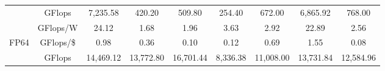 \begin{table}[h]
\begin{adjustwidth}{-1.0in}{-1.0in}
\begin{center}
{\begin{tabular}{cc||c|c|c|c|c|c|c}
                                  &  GFlops                                                                                 & 7,235.58                                                        & 420.20                                                           & 509.80                                                               & 254.40                                                        & 672.00                                                               & 6,865.92                                                               & 768.00                                                                 \\
                                  & \cellcolor[HTML]{EFEFEF}GFlops/W                                                       & \cellcolor[HTML]{EFEFEF}24.12                                   & \cellcolor[HTML]{EFEFEF}1.68                                     & \cellcolor[HTML]{EFEFEF}1.96                                         & \cellcolor[HTML]{EFEFEF}3.63                                  & \cellcolor[HTML]{EFEFEF}2.92                                         & \cellcolor[HTML]{EFEFEF}22.89                                          & \cellcolor[HTML]{EFEFEF}2.56                                           \\
\multirow{-3}{*}{FP64}            & GFlops/\$                                                                              & 0.98                                                            & 0.36                                                             & 0.10                                                                 & 0.12                                                          & 0.69                                                                 & 1.55                                                                   & 0.08                                                                   \\ \hline
                                  & \cellcolor[HTML]{EFEFEF}GFlops                                                         & \cellcolor[HTML]{EFEFEF}14,469.12                               & \cellcolor[HTML]{EFEFEF}13,772.80                                & \cellcolor[HTML]{EFEFEF}16,701.44                                    & \cellcolor[HTML]{EFEFEF}8,336.38                              & \cellcolor[HTML]{EFEFEF}11,008.00                                    & \cellcolor[HTML]{EFEFEF}13,731.84                                      & \cellcolor[HTML]{EFEFEF}12,584.96                                      \\

\end{tabular}}
\end{center}
\end{adjustwidth}
\end{table}
